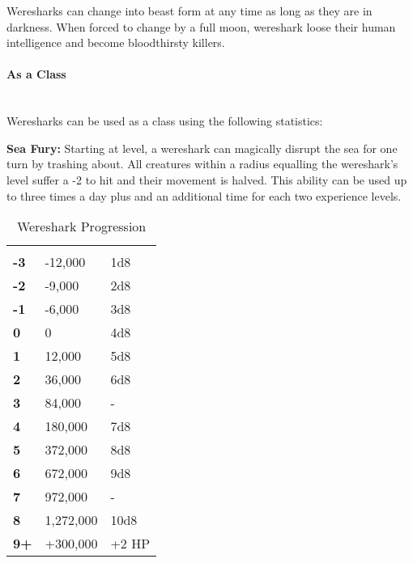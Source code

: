 \begin{multicols*}{2}
Weresharks can change into beast form at any time as long as they are in darkness. When forced to change by a full moon, wereshark loose their human intelligence and become bloodthirsty killers.

\paragraph{As a Class}\mbox{}\\
Weresharks can be used as a class using the following statistics:

\textbf{Sea Fury:} Starting at  level, a wereshark can magically disrupt the sea for one turn by trashing about. All creatures within a radius equalling the wereshark's level suffer a -2 to hit and their movement is halved. This ability can be used up to three times a day plus and an additional time for each two experience levels.


\begin {table}[H]
  \caption{Wereshark Progression}
  \begin{tabularx}{\columnwidth}{>{\bfseries}YYY}
   &  & \\
	-3 & -12,000 & 1d8\\
	-2 & -9,000 & 2d8\\
	-1 & -6,000 & 3d8\\
	0 & 0 & 4d8\\
	1 & 12,000 & 5d8\\
	2 & 36,000 & 6d8\\
	3 & 84,000 & -\\
	4 & 180,000 & 7d8\\
	5 & 372,000 & 8d8\\
	6 & 672,000 & 9d8\\
	7 & 972,000 & -\\
	8 & 1,272,000 & 10d8\\
	9+ & +300,000 & +2 HP
  \end {tabularx}
\end {table}


\end{multicols*}
